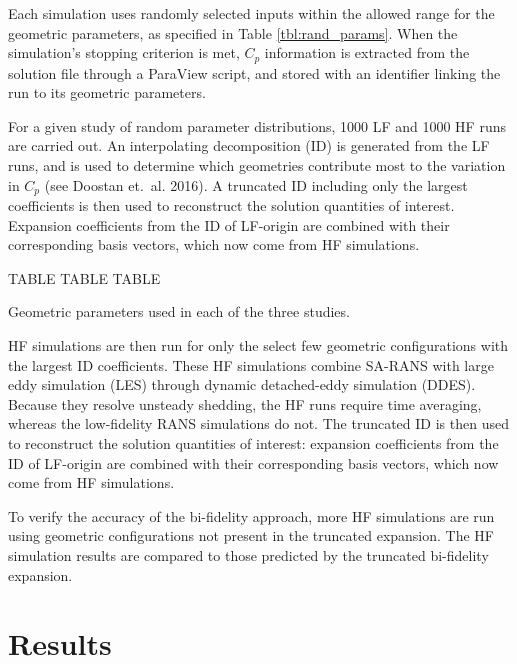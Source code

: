 \documentclass[11pt]{article}
\begin{document}
Each simulation uses randomly selected inputs within the allowed range for the geometric parameters, as specified in Table \ref{tbl:rand_params}. When the simulation's stopping criterion is met, $C_p$ information is extracted from the solution file through a ParaView script, and stored with an identifier linking the run to its geometric parameters.

For a given study of random parameter distributions, 1000 LF and 1000 HF runs are carried out. An interpolating decomposition (ID) is generated from the LF runs, and is used to determine which geometries contribute most to the variation in $C_p$ (see Doostan et.~al. 2016). A truncated ID including only the largest coefficients is then used to reconstruct the solution quantities of interest. Expansion coefficients from the ID of LF-origin are combined with their corresponding basis vectors, which now come from HF simulations.

\begin{table}[h]
\begin{center}
TABLE TABLE TABLE
\end{center}
\caption{Geometric parameters used in each of the three studies.}
\label{tbl:rand_params}
\end{table}

HF simulations are then run for only the select few geometric configurations with the largest ID coefficients. These HF simulations combine SA-RANS with large eddy simulation (LES) through dynamic detached-eddy simulation (DDES). Because they resolve unsteady shedding, the HF runs require time averaging, whereas the low-fidelity RANS simulations do not. The truncated ID is then used to reconstruct the solution quantities of interest: expansion coefficients from the ID of LF-origin are combined with their corresponding basis vectors, which now come from HF simulations.

To verify the accuracy of the bi-fidelity approach, more HF simulations are run using geometric configurations not present in the truncated expansion. The HF simulation results are compared to those predicted by the truncated bi-fidelity expansion.

\section{Results}
\end{document}
